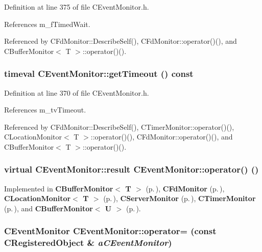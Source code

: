 Definition at line 375 of file CEvent\-Monitor.h.

References m\_\-f\-Timed\-Wait.

Referenced by CFd\-Monitor::Describe\-Self(), CFd\-Monitor::operator()(), and CBuffer\-Monitor$<$ T $>$::operator()().
\subsubsection{\setlength{\rightskip}{0pt plus 5cm}timeval CEvent\-Monitor::get\-Timeout () const\hspace{0.3cm}{\tt  [inline]}}\label{classCEventMonitor_a5}




Definition at line 370 of file CEvent\-Monitor.h.

References m\_\-tv\-Timeout.

Referenced by CFd\-Monitor::Describe\-Self(), CTimer\-Monitor::operator()(), CLocation\-Monitor$<$ T $>$::operator()(), CFd\-Monitor::operator()(), and CBuffer\-Monitor$<$ T $>$::operator()().
\subsubsection{\setlength{\rightskip}{0pt plus 5cm}virtual {\bf CEvent\-Monitor::result} CEvent\-Monitor::operator() ()\hspace{0.3cm}{\tt  [pure virtual]}}\label{classCEventMonitor_a7}




Implemented in {\bf CBuffer\-Monitor$<$ T $>$} {\rm (p.\,\pageref{classCBufferMonitor_a7})}, {\bf CFd\-Monitor} {\rm (p.\,\pageref{classCFdMonitor_a11})}, {\bf CLocation\-Monitor$<$ T $>$} {\rm (p.\,\pageref{classCLocationMonitor_a7})}, {\bf CServer\-Monitor} {\rm (p.\,\pageref{classCServerMonitor_a7})}, {\bf CTimer\-Monitor} {\rm (p.\,\pageref{classCTimerMonitor_a7})}, and {\bf CBuffer\-Monitor$<$ U $>$} {\rm (p.\,\pageref{classCBufferMonitor_a7})}.
\subsubsection{\setlength{\rightskip}{0pt plus 5cm}CEvent\-Monitor CEvent\-Monitor::operator= (const {\bf CRegistered\-Object} \& {\em a\-CEvent\-Monitor})\hspace{0.3cm}{\tt  [private]}}\label{classCEventMonitor_c1}


